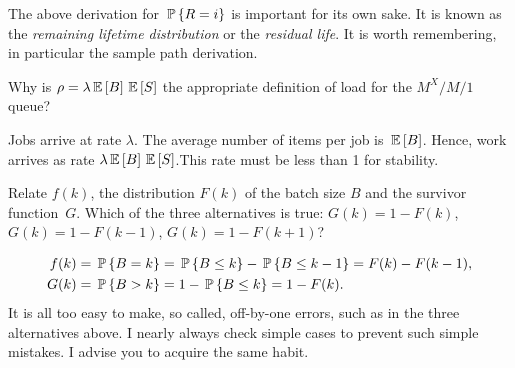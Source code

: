 \begin{remark}
  The above derivation for $\P{R=i}$ is important for its own sake. It
  is known as the \emph{remaining lifetime distribution} or the
  \emph{residual life}. It is worth remembering, in particular the
  sample path derivation. 
\end{remark}

\begin{question}
  Why is $\rho = \lambda \E B \E S$ the appropriate definition
  of load for the $M^X/M/1$ queue?
  \begin{solution}
    Jobs arrive at rate $\lambda$. The average number of items per job
    is $\E B$. Hence, work arrives as rate $\lambda \E B \E S$.This
    rate must be less than 1 for stability.
  \end{solution}
\end{question}

\begin{question}
  Relate $f(k)$, the distribution $F(k)$ of the batch size $B$ and the
  survivor function~$G$. Which of the three alternatives is true:
  $G(k) = 1-F(k)$, $G(k) = 1-F(k-1)$, $G(k) = 1-F(k+1)$?
  \begin{solution}
    \begin{align*}
    f(k) &= \P{B=k} = \P{B\leq k} - \P{B\leq k-1} = F(k)-F(k-1), \\
    G(k) &= \P{B>k} = 1 - \P{B\leq k} = 1-F(k).        
    \end{align*}
    It is all too easy to make, so called, off-by-one errors, such as
    in the three alternatives above.  I nearly always check simple
    cases to prevent such simple mistakes. I advise you to acquire the
    same habit.
  \end{solution}
\end{question}

